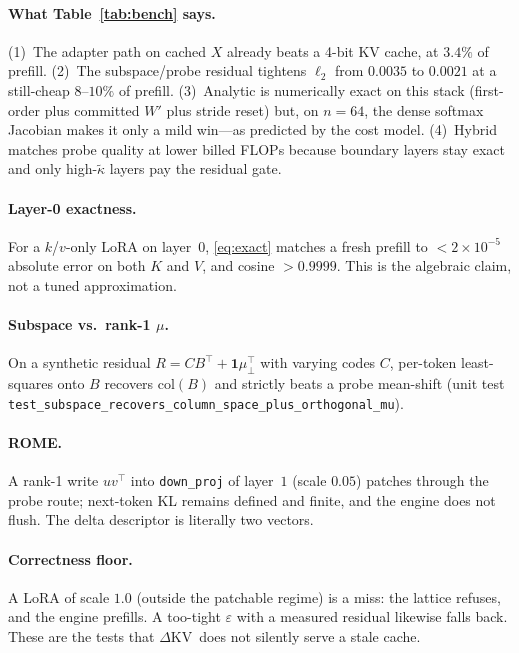 \documentclass{article}
\newcommand{\dkv}{$\Delta$KV}
\begin{document}
\paragraph{What Table~\ref{tab:bench} says.}
(1)~The adapter path on cached $X$ already beats a 4-bit KV cache, at
$3.4\%$ of prefill.
(2)~The subspace/probe residual tightens $\ell_2$ from $0.0035$ to
$0.0021$ at a still-cheap $8$--$10\%$ of prefill.
(3)~Analytic is numerically exact on this stack (first-order plus
committed $W'$ plus stride reset) but, on $n{=}64$, the dense softmax
Jacobian makes it only a mild win---as predicted by the cost model.
(4)~Hybrid matches probe quality at lower billed FLOPs because boundary
layers stay exact and only high-$\tilde\kappa$ layers pay the residual
gate.

\paragraph{Layer-0 exactness.}
For a $k$/$v$-only LoRA on layer~$0$, \eqref{eq:exact} matches a fresh
prefill to $<2{\times}10^{-5}$ absolute error on both $K$ and $V$, and
cosine $>0.9999$.
This is the algebraic claim, not a tuned approximation.

\paragraph{Subspace vs.\ rank-1 $\mu$.}
On a synthetic residual $R=CB^\top+\mathbf{1}\mu_\perp^\top$ with
varying codes $C$, per-token least-squares onto $B$ recovers $\mathrm{col}(B)$
and strictly beats a probe mean-shift (unit test
\texttt{test\_subspace\_recovers\_column\_space\_plus\_orthogonal\_mu}).

\paragraph{ROME.}
A rank-1 write $uv^\top$ into \texttt{down\_proj} of layer~$1$ (scale
$0.05$) patches through the probe route; next-token KL remains defined and
finite, and the engine does not flush.
The delta descriptor is literally two vectors.

\paragraph{Correctness floor.}
A LoRA of scale $1.0$ (outside the patchable regime) is a miss: the
lattice refuses, and the engine prefills.
A too-tight $\varepsilon$ with a measured residual likewise falls back.
These are the tests that \dkv\ does not silently serve a stale cache.
\end{document}
